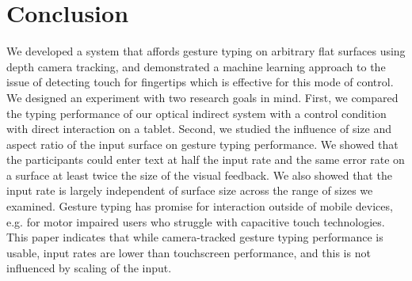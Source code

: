 \documentclass{chi-ext}
\begin{document}
\section{Conclusion}
We developed a system that affords gesture typing on arbitrary flat surfaces using depth camera tracking, and demonstrated a machine learning approach to the issue of detecting touch for fingertips which is effective for this mode of control. We designed an experiment with two research goals in mind. First, we compared the typing performance of our optical indirect system with a control condition with direct interaction on a tablet. Second, we studied the influence of size and aspect ratio of the input surface on gesture typing performance. We showed that the participants could enter text at half the input rate and the same error rate on a surface at least twice the size of the visual feedback. We also showed that the input rate is largely independent of surface size across the range of sizes we examined. Gesture typing has promise for interaction outside of mobile devices, e.g. for motor impaired users who struggle with capacitive touch technologies. This paper indicates that while camera-tracked gesture typing performance is usable, input rates are lower than touchscreen performance, and this is not influenced by scaling of the input.




\balance


\end{document}
